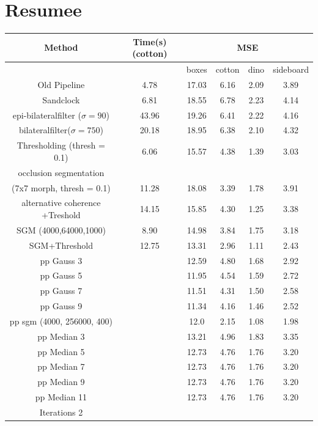 \documentclass  [
  paper    = a4,
  BCOR     = 10mm,
  twoside,
  fontsize = 12pt,
  fleqn,
  toc      = bibnumbered,
  toc      = listofnumbered,
  numbers  = noendperiod,
  headings = normal,
  listof   = leveldown,
  version  = 3.03
]                                       {scrreprt}
\begin{document}
\section{Resumee}
\begin{table}
	\begin{tabular}{|c|c|c|c|c|c|}
		\hline 
		Method & Time(s) (cotton) & \multicolumn{4}{c|}{MSE} \\ 
		\hline 
		&  & boxes & cotton & dino & sideboard \\ 
		\hline
		Old Pipeline & 4.78 & 17.03 & 6.16 & 2.09 & 3.89 \\
		\hline 
		Sandclock & 6.81  & 18.55  & 6.78  & 2.23  & 4.14 \\ 
		\hline 
		epi-bilateralfilter ($\sigma = 90$) &  43.96 &  19.26  & 6.41  & 2.22  & 4.16  \\ 
		\hline 
		bilateralfilter($\sigma = 750$) & 20.18  & 18.95  &  6.38 & 2.10  &4.32  \\ 
		\hline 
		Thresholding (thresh = 0.1) & 6.06 & 15.57  & 4.38  & 1.39  & 3.03  \\ 
		\hline 
		occlusion segmentation&&&&&\\(7x7 morph, thresh = 0.1) & 11.28  & 18.08 &  3.39 & 1.78  & 3.91  \\ 
		\hline 
		alternative coherence +Treshold & 14.15  & 15.85  & 4.30  & 1.25  & 3.38  \\ 
		\hline 
		SGM (4000,64000,1000) & 8.90 & 14.98  & 3.84  & 1.75  & 3.18  \\ 
		\hline 
		SGM+Threshold & 12.75  & 13.31  & 2.96   & 1.11   & 2.43 \\ 
		\hline 
		\hline
		pp Gauss 3 & & 12.59 & 4.80 & 1.68 & 2.92 \\
		\hline
		pp Gauss 5 & & 11.95 & 4.54 & 1.59 &  2.72 \\
		\hline 
		pp Gauss 7 & & 11.51 & 4.31 & 1.50 & 2.58 \\
		\hline
		pp Gauss 9 & & 11.34 & 4.16 & 1.46 & 2.52 \\
		\hline
		pp sgm (4000, 256000, 400) & &12.0 & 2.15 & 1.08 & 1.98\\
		\hline
		pp Median 3 & & 13.21 & 4.96 & 1.83 & 3.35 \\
		\hline
		pp Median 5 & & 12.73 & 4.76 & 1.76 & 3.20 \\
		\hline
		pp Median 7 & & 12.73 & 4.76 & 1.76 & 3.20 \\
		\hline 
		pp Median 9 & & 12.73 & 4.76 & 1.76 &3.20 \\
		\hline 
		pp Median 11 & & 12.73 & 4.76 & 1.76 &3.20 \\
		\hline
		Iterations 2 & & 
	\end{tabular} 
\end{table}
\end{document}
